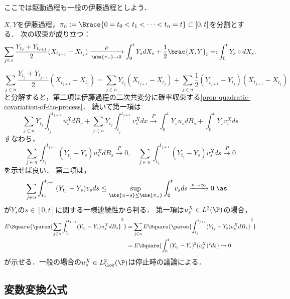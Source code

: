 \documentclass[uplatex,dvipdfmx]{jsreport}
\begin{document}
\begin{tcolorbox}[colframe=ForestGreen, colback=ForestGreen!10!white,breakable,colbacktitle=ForestGreen!40!white,coltitle=black,fonttitle=\bfseries\sffamily,
title=]
    ここでは駆動過程も一般の伊藤過程としよう．
\end{tcolorbox}

\begin{proposition}
    $X,Y$を伊藤過程，$\pi_n:=\Brace{0=t_0<t_1<\cdots<t_n=t}\subset[0,t]$を分割とする．
    次の収束が成り立つ：
    \[\sum_{j\in\pi}\frac{Y_{t_j}+Y_{t_{j+1}}}{2}(X_{t_{j+1}}-X_{t_j})\xrightarrow[\abs{\pi_n}\to0]{P}\int^t_0Y_sdX_s+\frac{1}{2}\brac{X,Y}_t=:\int^t_0Y_s\circ dX_s.\]
\end{proposition}
\begin{Proof}
    \[\sum_{j\in n}\frac{Y_{t_j}+Y_{t_{j+1}}}{2}(X_{t_{j+1}}-X_{t_j})=\sum_{j\in  n}Y_{t_j}(X_{t_{j+1}}-X_{t_j})+\sum_{j\in n}\frac{1}{2}(Y_{t_{j+1}}-Y_{t_j})(X_{t_{j+1}}-X_{t_j})\]
    と分解すると，第二項は伊藤過程の二次共変分に確率収束する\ref{prop-quadratic-covariation-of-ito-process}．
    続いて第一項は
    \[\sum_{j\in n}Y_{t_j}\int^{t_{j+1}}_{t_j}u_s^XdB_s+\sum_{j\in n}Y_{t_j}\int^{t_{j+1}}_{t_j}v_s^Xdx\xrightarrow{P}\int^t_0Y_su_sdB_s+\int^t_0Y_sv_s^Xds\]
    すなわち，
    \[\sum_{j\in n}\int^{t_{j+1}}_{t_j}(Y_{t_j}-Y_s)u_s^XdB_s\xrightarrow{P}0,\quad\sum_{j\in n}\int^{t_{j+1}}_{t_j}(Y_{t_j}-Y_s)v_s^Xds\xrightarrow{P}0\]
    を示せば良い．
    第二項は，
    \begin{align*}
        \sum_{j\in n}\int^{t_{j+1}}_{t_j}(Y_{t_j}-Y_s)v_sds&\le\sup_{\abs{u-s}\le\abs{\pi_n}}\int^{t}_0v_sds\xrightarrow{n\to\infty}0\;\as
    \end{align*}
    が$Y_s$の$s\in[0,t]$に関する一様連続性から判る．
    第一項は$u_s^X\in L^2(\P)$の場合，
    \begin{align*}
        E\Square{\paren{\sum_{j\in n}\int^{t_{j+1}}_{t_j}(Y_{t_j}-Y_s)u_s^XdB_s}^2}&=\sum_{j\in n}E\Square{\paren{\int^{t_{j+1}}_{t_j}(Y_{t_j}-Y_s)u_s^XdB_s}^2}\\
        &=E\Square{\int^t_0(Y_{t_j}-Y_s)^2(u_s^X)^2ds}\to0
    \end{align*}
    が示せる．一般の場合の$u_s^X\in L^2_\loc(\P)$は停止時の議論による．
\end{Proof}

\subsection{変数変換公式}
\end{document}
